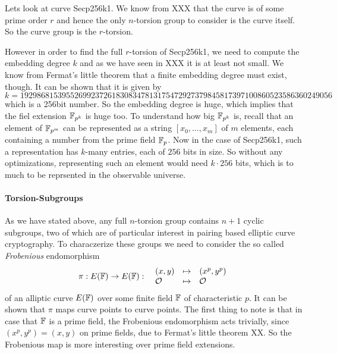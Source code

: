 \begin{example}
Lets look at curve Secp256k1. We know from XXX that the curve is of some prime order $r$ and hence the only $n$-torsion group to consider is the curve itself. So the curve group is the $r$-torsion.

However in order to find the full $r$-torsion of Secp256k1, we need to compute the embedding degree $k$ and as we have seen in XXX it is at least not small. We know from Fermat's little theorem that a finite embedding degree must exist, though. It can be shown that it is given by
$$
k = \scriptstyle 192986815395526992372618308347813175472927379845817397100860523586360249056
$$
which is a 256bit number. So the embedding degree is huge, which implies that the fiel extension $\mathbb{F}_{p^k}$ is huge too. To understand how big $\mathbb{F}_{p^k}$ is, recall that an element of $\mathbb{F}_{p^m}$ can be represented as a string $[x_0,\ldots,x_m]$ of $m$ elements, each containing a number from the prime field $\mathbb{F}_p$. Now in the case of Secp256k1, such a representation has $k$-many entries, each of $256$ bits in size. So without any optimizations, representing such an element would need $k\cdot 256$ bits, which is to much to be reprsented in the observable universe.
\end{example}
\paragraph{Torsion-Subgroups}As we have stated above, any full $n$-torsion group contains $n+1$ cyclic subgroups, two of which are of particular interest in pairing based elliptic curve cryptography. To characzerize these groups we need to consider the so called \textit{Frobenious} endomorphism
\begin{equation}
\pi : E(\mathbb{F}) \to E(\mathbb{F}): \;\;
\begin{array}{lcl}
(x,y)       &\mapsto & (x^p,y^p)\\
\mathcal{O} &\mapsto & \mathcal{O}
\end{array}
\end{equation}
of an alliptic curve $E(\mathbb{F})$ over some finite field $\mathbb{F}$ of characteristic $p$. It can be shown that $\pi$ maps curve points to curve points. The first thing to note is that in case that $\mathbb{F}$ is a prime field, the Frobenious endomorphism acts trivially, since $(x^p,y^p) = (x,y)$ on prime fields, due to Fermat's little theorem XX. So the Frobenious map is more interesting over prime field extensions.

